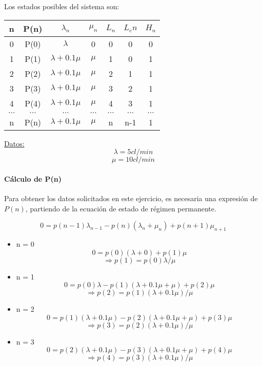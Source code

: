 \documentclass{article}
\begin{document}
   Los estados posibles del sistema son:
   \begin{center}
   \begin{tabular}{|| c | c | c | c | c | c | c ||}
   \hline 
      n     & P(n) & $\lambda_n$         & $\mu_n$ & $L_n$& $L_cn$ & $H_n$ \\ \hline \hline
      0     & P(0) & $\lambda$           & 0       & 0    & 0      & 0     \\ \hline
      1     & P(1) & $\lambda + 0.1 \mu$ & $\mu$   & 1    & 0      & 1     \\ \hline
      2     & P(2) & $\lambda + 0.1 \mu$ & $\mu$   & 2    & 1      & 1     \\ \hline
      3     & P(3) & $\lambda + 0.1 \mu$ & $\mu$   & 3    & 2      & 1     \\ \hline
      4     & P(4) & $\lambda + 0.1 \mu$ & $\mu$   & 4    & 3      & 1     \\ \hline
      $...$ & $...$& $...$               & $...$   & $...$& $...$  & $...$ \\ \hline
      n     & P(n) & $\lambda + 0.1 \mu$ & $\mu$   & n    & n-1    & 1     \\ \hline
   \end{tabular}
   \end{center}

   \underline{Datos:} \\
   $$\lambda = 5 cl/min $$
   $$\mu = 10 cl/min $$

   \paragraph{Cálculo de P(n)}
   Para obtener los datos solicitados en este ejercicio, es necesaria una expresión de $P(n)$, partiendo de la ecuación de estado de régimen permanente.

      $$0 = p(n-1) \lambda_{n-1} - p(n) (\lambda_n + \mu_n) + p(n+1) \mu_{n+1}$$

      \begin{itemize}
         \item{n = 0}
            $$0 = p(0) (\lambda + 0) + p(1) \mu$$
            $$\Rightarrow p(1) = p(0) \lambda / \mu$$
         \item{n = 1}
            $$0 = p(0) \lambda - p(1) (\lambda + 0.1 \mu + \mu) + p(2) \mu$$
            $$\Rightarrow p(2) = p(1) (\lambda + 0.1 \mu) / \mu$$
         \item{n = 2}
            $$0 = p(1) (\lambda + 0.1 \mu) - p(2) (\lambda + 0.1 \mu + \mu) + p(3) \mu$$
            $$\Rightarrow p(3) = p(2) (\lambda + 0.1 \mu) / \mu$$
         \item{n = 3}
            $$0 = p(2) (\lambda + 0.1 \mu) - p(3) (\lambda + 0.1 \mu + \mu) + p(4) \mu$$
            $$\Rightarrow p(4) = p(3) (\lambda + 0.1 \mu) / \mu$$
      \end{itemize}
\end{document}
